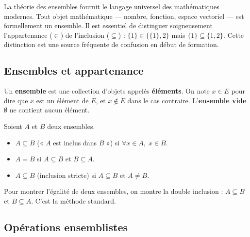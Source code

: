 \documentclass[11pt,a4paper,twoside]{book}
\begin{document}
La théorie des ensembles fournit le langage universel des mathématiques modernes. Tout objet mathématique — nombre, fonction, espace vectoriel — est formellement un ensemble. Il est essentiel de distinguer soigneusement l'appartenance ($\in$) de l'inclusion ($\subseteq$) : $\{1\} \in \{\{1\},2\}$ mais $\{1\} \subseteq \{1,2\}$. Cette distinction est une source fréquente de confusion en début de formation.

\subsection{Ensembles et appartenance}

\begin{definitionbox}
Un \textbf{ensemble} est une collection d'objets appelés \textbf{éléments}.
On note $x \in E$ pour dire que $x$ est un élément de $E$, et $x \notin E$ dans le cas contraire.
L'\textbf{ensemble vide} $\emptyset$ ne contient aucun élément.
\end{definitionbox}

\begin{definitionbox}
Soient $A$ et $B$ deux ensembles.
\begin{itemize}
  \item $A \subseteq B$ (« $A$ est inclus dans $B$ ») si $\forall x \in A,\; x \in B$.
  \item $A = B$ si $A \subseteq B$ et $B \subseteq A$.
  \item $A \subsetneq B$ (inclusion stricte) si $A \subseteq B$ et $A \neq B$.
\end{itemize}
\end{definitionbox}

\begin{remarquebox}
Pour montrer l'égalité de deux ensembles, on montre la double inclusion :
$A \subseteq B$ et $B \subseteq A$. C'est la méthode standard.
\end{remarquebox}

\subsection{Opérations ensemblistes}
\end{document}
